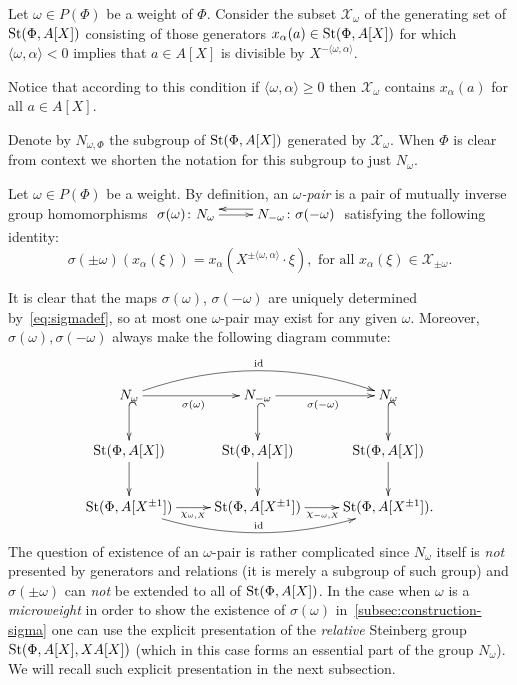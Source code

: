 Let $\omega \in P(\Phi)$ be a weight of $\Phi$.
Consider the subset $\mathcal{X}_\omega$ of the generating set of $\operatorname{St}(\Phi, A[X])$ consisting of those generators $x_{\alpha}(a) \in \operatorname{St}(\Phi, A[X])$ for which
$\langle \omega, \alpha\rangle < 0$ implies that $a \in A[X]$ is divisible by $X^{-\langle \omega, \alpha\rangle}$.
\begin{rem}
    Notice that according to this condition if $\langle \omega, \alpha\rangle \geq 0$ then $\mathcal{X}_\omega$ contains $x_\alpha(a)$ for all $a \in A[X]$.
\end{rem}
Denote by $N_{\omega, \Phi}$ the subgroup of $\operatorname{St}(\Phi, A[X])$ generated by $\mathcal{X}_\omega$.
When $\Phi$ is clear from context we shorten the notation for this subgroup to just $N_\omega$.

\begin{dfn} \label{dfn:delta-pair}
Let $\omega \in P(\Phi)$ be a weight.
By definition, an {\it $\omega$-pair} is a pair of mutually inverse group homomorphisms
$\xymatrix{ \sigma(\omega)\colon N_\omega \ar[r] & \ar@<-1.0ex>[l] N_{-\omega}\colon \sigma(-\omega) }$ satisfying the following identity:
\begin{equation} \label{eq:sigmadef}
\sigma(\pm \omega)(x_\alpha(\xi)) = x_\alpha(X^{\pm\langle\omega, \alpha\rangle}\cdot \xi),
\text{ for all } x_\alpha(\xi) \in \mathcal{X}_{\pm\omega}.
\end{equation}\end{dfn}
It is clear that the maps $\sigma(\omega)$, $\sigma(-\omega)$ are uniquely determined by~\eqref{eq:sigmadef}, so at most one $\omega$-pair may exist for any given $\omega$.
Moreover, $\sigma(\omega), \sigma(-\omega)$ always make the following diagram commute:
\begin{equation} \label{eq:sigma-diagram}
\xymatrix{ N_\omega \ar[r]_{\sigma(\omega)}\ar@{^{(}->}[d] \ar@/^1.5pc/[rr]^{\mathrm{id}} & N_{-\omega} \ar@{^{(}->}[d] \ar[r]_{\sigma(-\omega)} & N_\omega \ar@{^{(}->}[d] \\
\St(\Phi, A[X]) \ar[d] & \St(\Phi, A[X]) \ar[d] & \St(\Phi, A[X]) \ar[d] \\
\St(\Phi, A[X^{\pm 1}]) \ar@<-0.0ex>[r]_{\chi_{\omega, X}} \ar@/_1.5pc/[rr]^{\mathrm{id}} & \St(\Phi, A[X^{\pm 1}]) \ar@<-0.0ex>[r]_{\chi_{-\omega, X}} & \St(\Phi, A[X^{\pm 1}]).} \end{equation}
The question of existence of an $\omega$-pair is rather complicated since $N_\omega$ itself is \textit{not} presented by generators and relations
 (it is merely a subgroup of such group) and $\sigma(\pm \omega)$ can \textit{not} be extended to all of $\operatorname{St}(\Phi, A[X])$.
In the case when $\omega$ is a \textit{microweight} in order to show the existence of $\sigma(\omega)$ in~\cref{subsec:construction-sigma} one can use
 the explicit presentation of the \textit{relative} Steinberg group $\operatorname{St}(\Phi, A[X], XA[X])$
  (which in this case forms an essential part of the group $N_\omega$).
We will recall such explicit presentation in the next subsection.

